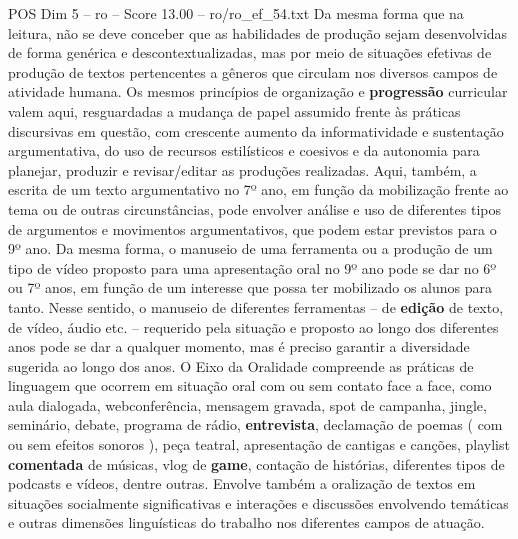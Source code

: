 \begin{textsample}{POS Dim 5 – ro – Score 13.00 – ro/ro\_ef\_54.txt}  \label{ex:f5_pos_112}
Da mesma forma que na leitura, não se deve conceber que as habilidades de produção sejam desenvolvidas de forma genérica e descontextualizadas, mas por meio de situações efetivas de produção de textos pertencentes a gêneros que circulam nos diversos campos de atividade humana.
Os mesmos princípios de organização e \textbf{progressão} curricular valem aqui, resguardadas a mudança de papel assumido frente às práticas discursivas em questão, com crescente aumento da informatividade e sustentação argumentativa, do uso de recursos estilísticos e coesivos e da autonomia para planejar, produzir e revisar/editar as produções realizadas.
Aqui, também, a escrita de um texto argumentativo no 7º ano, em função da mobilização frente ao tema ou de outras circunstâncias, pode envolver análise e uso de diferentes tipos de argumentos e movimentos argumentativos, que podem estar previstos para o 9º ano.
Da mesma forma, o manuseio de uma ferramenta ou a produção de um tipo de vídeo proposto para uma apresentação oral no 9º ano pode se dar no 6º ou 7º anos, em função de um interesse que possa ter mobilizado os alunos para tanto.
Nesse sentido, o manuseio de diferentes ferramentas – de \textbf{edição} de texto, de vídeo, áudio etc. – requerido pela situação e proposto ao longo dos diferentes anos pode se dar a qualquer momento, mas é preciso garantir a diversidade sugerida ao longo dos anos.
O Eixo da Oralidade compreende as práticas de linguagem que ocorrem em situação oral com ou sem contato face a face, como aula dialogada, webconferência, mensagem gravada, spot de campanha, jingle, seminário, debate, programa de rádio, \textbf{entrevista}, declamação de poemas ( com ou sem efeitos sonoros ), peça teatral, apresentação de cantigas e canções, playlist \textbf{comentada} de músicas, vlog de \textbf{game}, contação de histórias, diferentes tipos de podcasts e vídeos, dentre outras.
Envolve também a oralização de textos em situações socialmente significativas e interações e discussões envolvendo temáticas e outras dimensões linguísticas do trabalho nos diferentes campos de atuação.

\end{textsample}
